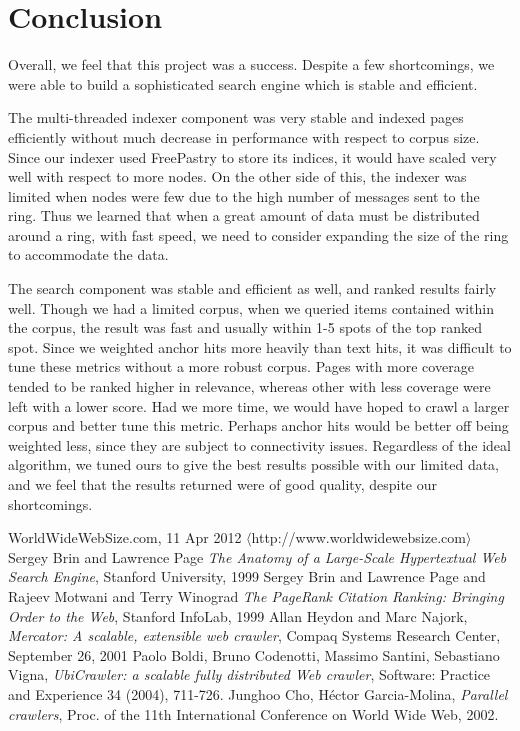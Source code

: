 \documentclass[11pt, letterpaper, oneside, twocolumn]{article}
\begin{document}
\section{Conclusion}
\label{sec:conculsion}
Overall, we feel that this project was a success.
Despite a few shortcomings, we were able to build a sophisticated search engine which is stable and efficient.

The multi-threaded indexer component was very stable and indexed pages efficiently without much decrease in performance with respect to corpus size.
Since our indexer used FreePastry to store its indices, it would have scaled very well with respect to more nodes.
On the other side of this, the indexer was limited when nodes were few due to the high number of messages sent to the ring.
Thus we learned that when a great amount of data must be distributed around a ring, with fast speed, we need to consider expanding the size of the ring to accommodate the data.

The search component was stable and efficient as well, and ranked results fairly well. 
Though we had a limited corpus, when we queried items contained within the corpus, the result was fast and usually within 1-5 spots of the top ranked spot. 
Since we weighted anchor hits more heavily than text hits, it was difficult to tune these metrics without a more robust corpus. 
Pages with more coverage tended to be ranked higher in relevance, whereas other with less coverage were left with a lower score. 
Had we more time, we would have hoped to crawl a larger corpus and better tune this metric. 
Perhaps anchor hits would be better off being weighted less, since they are subject to connectivity issues. 
Regardless of the ideal algorithm, we tuned ours to give the best results possible with our limited data, and we feel that the results returned were of good quality, despite our shortcomings.




\begin{thebibliography}{9}

   WorldWideWebSize.com, 11 Apr 2012 $\langle$http://www.worldwidewebsize.com$\rangle$
   Sergey Brin and Lawrence Page \emph{The Anatomy of a Large-Scale Hypertextual Web Search Engine}, Stanford University, 1999
   Sergey Brin and  Lawrence Page and Rajeev Motwani and Terry Winograd \emph{The PageRank Citation Ranking: Bringing Order to the Web}, Stanford InfoLab, 1999
   Allan Heydon and Marc Najork, \emph{Mercator: A scalable, extensible web crawler}, Compaq Systems Research Center, September 26, 2001
   Paolo Boldi, Bruno Codenotti, Massimo Santini, Sebastiano Vigna, \emph{UbiCrawler: a scalable fully distributed Web crawler}, Software: Practice and Experience 34 (2004), 711-726.
   Junghoo Cho, H\'{e}ctor Garcia-Molina, \emph{Parallel crawlers}, Proc. of the 11th International Conference on World Wide Web, 2002.


\end{thebibliography}
\end{document}
